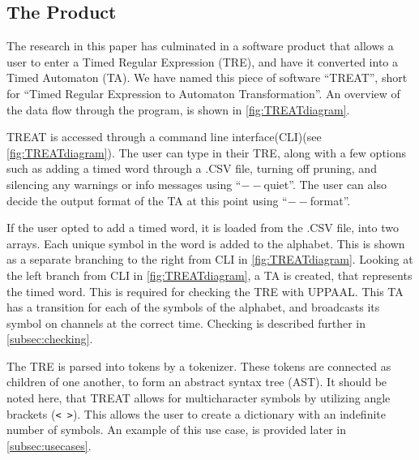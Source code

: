 \subsection{The Product}\label{subsec:theProduct}
The research in this paper has culminated in a software product that allows a user to enter a Timed Regular Expression (TRE), and have it converted into a Timed Automaton (TA).
We have named this piece of software ``TREAT'', short for ``Timed Regular Expression to Automaton Transformation''.
An overview of the data flow through the program, is shown in \cref{fig:TREATdiagram}.

\begin{center}
    
\end{center}
\vspace{0.75em}


TREAT is accessed through a command line interface(CLI)(see \cref{fig:TREATdiagram}). The user can type in their TRE, along with a few options such as adding a timed word through a .CSV file, turning off pruning, and silencing any warnings or info messages using ``$--$quiet''.
The user can also decide the output format of the TA at this point using ``$--$format''.

\vspace{.5\baselineskip plus 2pt}
If the user opted to add a timed word, it is loaded from the .CSV file, into two arrays. Each unique symbol in the word is added to the alphabet. This is shown as a separate branching to the right from CLI in \cref{fig:TREATdiagram}.
Looking at the left branch from CLI in \cref{fig:TREATdiagram}, a TA is created, that represents the timed word. This is required for checking the TRE with UPPAAL. This TA has a transition for each of the symbols of the alphabet, and broadcasts its symbol on channels at the correct time. Checking is described further in \cref{subsec:checking}.

\vspace{.5\baselineskip plus 2pt}
The TRE is parsed into tokens by a tokenizer. These tokens are connected as children of one another, to form an abstract syntax tree (AST).
It should be noted here, that TREAT allows for multicharacter symbols by utilizing angle brackets (\verb|< >|). This allows the user to create a dictionary with an indefinite number of symbols. An example of this use case, is provided later in \cref{subsec:usecases}.

